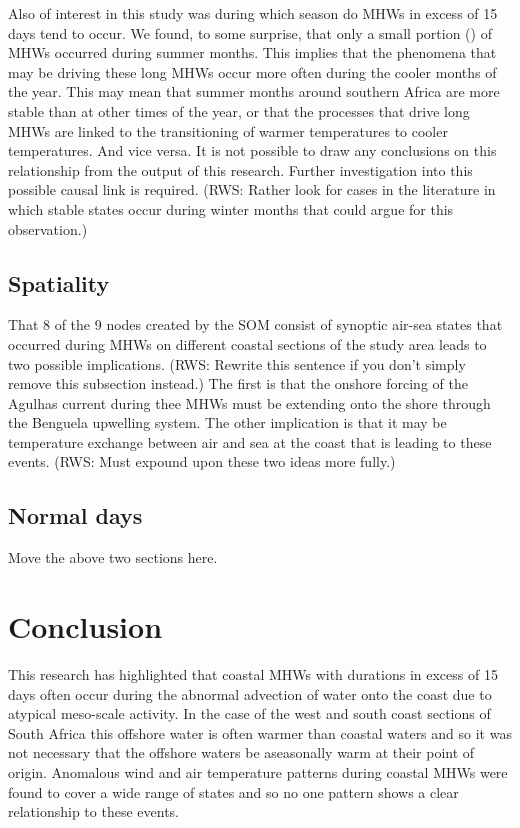 \documentclass[a4paper,10pt,review]{elsarticle}
\begin{document}
Also of interest in this study was during which season do MHWs in excess of 15 days tend to occur. We found, to some surprise, that only a small portion () of MHWs occurred during summer months. This implies that the phenomena that may be driving these long MHWs occur more often during the cooler months of the year. This may mean that summer months around southern Africa are more stable than at other times of the year, or that the processes that drive long MHWs are linked to the transitioning of warmer temperatures to cooler temperatures. And vice versa. It is not possible to draw any conclusions on this relationship from the output of this research. Further investigation into this possible causal link is required. (RWS: Rather look for cases in the literature in which stable states occur during winter months that could argue for this observation.)

\subsection{Spatiality}
That 8 of the 9 nodes created by the SOM consist of synoptic air-sea states that occurred during MHWs on different coastal sections of the study area leads to two possible implications. (RWS: Rewrite this sentence if you don't simply remove this subsection instead.) The first is that the onshore forcing of the Agulhas current during thee MHWs must be extending onto the shore through the Benguela upwelling system. The other implication is that it may be temperature exchange between air and sea at the coast that is leading to these events. (RWS: Must expound upon these two ideas more fully.)

\subsection{Normal days}
Move the above two sections here.

\section{Conclusion}
This research has highlighted that coastal MHWs with durations in excess of 15 days often occur during the abnormal advection of water onto the coast due to atypical meso-scale activity. In the case of the west and south coast sections of South Africa this offshore water is often warmer than coastal waters and so it was not necessary that the offshore waters be aseasonally warm at their point of origin. Anomalous wind and air temperature patterns during coastal MHWs were found to cover a wide range of states and so no one pattern shows a clear relationship to these events.
\end{document}
